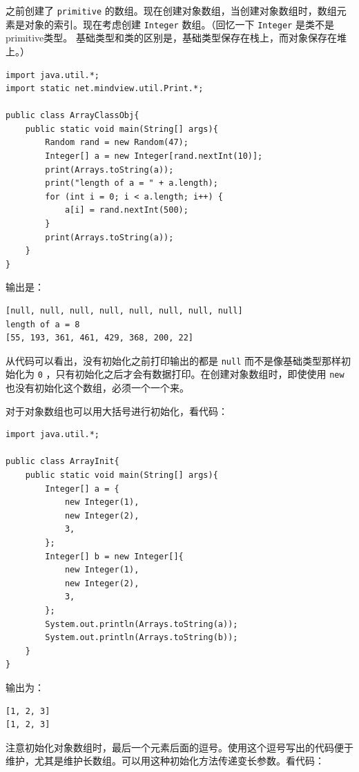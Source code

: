 \documentclass[10pt,a4paper,UTF8]{article}
\begin{document}
之前创建了 \texttt{primitive} 的数组。现在创建对象数组，当创建对象数组时，数组元素是对象的索引。现在考虑创建 \texttt{Integer} 数组。（回忆一下 \texttt{Integer} 是类不是primitive类型。 基础类型和类的区别是，基础类型保存在栈上，而对象保存在堆上。）

\lstset{language=C,label= ,caption= ,captionpos=b,firstnumber=1,numbers=left}
\begin{lstlisting}
import java.util.*;
import static net.mindview.util.Print.*;

public class ArrayClassObj{
    public static void main(String[] args){
        Random rand = new Random(47);
        Integer[] a = new Integer[rand.nextInt(10)];
        print(Arrays.toString(a));
        print("length of a = " + a.length);
        for (int i = 0; i < a.length; i++) {
            a[i] = rand.nextInt(500);
        }
        print(Arrays.toString(a));
    }
}
\end{lstlisting}
输出是：
\begin{verbatim}
[null, null, null, null, null, null, null, null]
length of a = 8
[55, 193, 361, 461, 429, 368, 200, 22]
\end{verbatim}
从代码可以看出，没有初始化之前打印输出的都是 \texttt{null} 而不是像基础类型那样初始化为 \texttt{0} ，只有初始化之后才会有数据打印。在创建对象数组时，即使使用 \texttt{new} 也没有初始化这个数组，必须一个一个来。

对于对象数组也可以用大括号进行初始化，看代码：
\lstset{language=C,label= ,caption= ,captionpos=b,firstnumber=1,numbers=left}
\begin{lstlisting}
import java.util.*;

public class ArrayInit{
    public static void main(String[] args){
        Integer[] a = {
            new Integer(1),
            new Integer(2),
            3,
        };
        Integer[] b = new Integer[]{
            new Integer(1),
            new Integer(2),
            3,
        };
        System.out.println(Arrays.toString(a));
        System.out.println(Arrays.toString(b));
    }
}
\end{lstlisting}
输出为：
\begin{verbatim}
[1, 2, 3]
[1, 2, 3]
\end{verbatim}

注意初始化对象数组时，最后一个元素后面的逗号。使用这个逗号写出的代码便于维护，尤其是维护长数组。可以用这种初始化方法传递变长参数。看代码：
\end{document}
